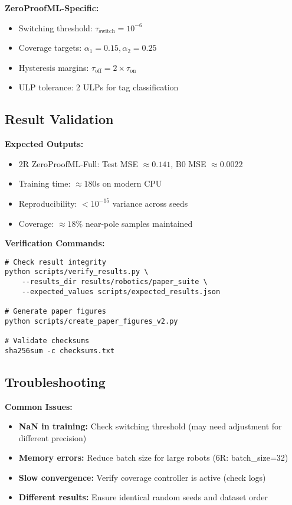 \documentclass[twoside,11pt]{article}
\begin{document}
\textbf{ZeroProofML-Specific:}
\begin{itemize}
\item Switching threshold: $\tau_{\text{switch}} = 10^{-6}$
\item Coverage targets: $\alpha_1 = 0.15, \alpha_2 = 0.25$
\item Hysteresis margins: $\tau_{\text{off}} = 2 \times \tau_{\text{on}}$
\item ULP tolerance: 2 ULPs for tag classification
\end{itemize}

\subsection{Result Validation}

\textbf{Expected Outputs:}
\begin{itemize}
\item 2R ZeroProofML-Full: Test MSE $\approx 0.141$, B0 MSE $\approx 0.0022$
\item Training time: $\approx 180$s on modern CPU
\item Reproducibility: $< 10^{-15}$ variance across seeds
\item Coverage: $\approx 18\%$ near-pole samples maintained
\end{itemize}

\textbf{Verification Commands:}
\begin{verbatim}
# Check result integrity
python scripts/verify_results.py \
    --results_dir results/robotics/paper_suite \
    --expected_values scripts/expected_results.json

# Generate paper figures
python scripts/create_paper_figures_v2.py

# Validate checksums
sha256sum -c checksums.txt
\end{verbatim}

\subsection{Troubleshooting}

\textbf{Common Issues:}
\begin{itemize}
\item \textbf{NaN in training:} Check switching threshold (may need adjustment for different precision)
\item \textbf{Memory errors:} Reduce batch size for large robots (6R: batch\_size=32)
\item \textbf{Slow convergence:} Verify coverage controller is active (check logs)
\item \textbf{Different results:} Ensure identical random seeds and dataset order
\end{itemize}
\end{document}
